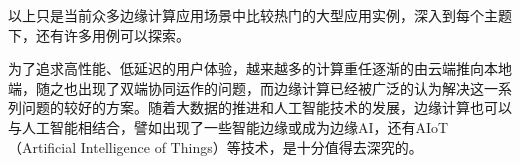 \documentclass[UTF8,12pt,twoside,a4paper]{ctexart} %
\begin{document}
以上只是当前众多边缘计算应用场景中比较热门的大型应用实例，深入到每个主题下，还有许多用例可以探索。 
\vspace{10pt}

\clearpage{\pagestyle{empty}}%


\begin{center}
\end{center}
\vspace*{10pt}
\songti
\hspace{1.6em}
为了追求高性能、低延迟的用户体验，越来越多的计算重任逐渐的由云端推向本地端，随之也出现了双端协同运作的问题，而边缘计算已经被广泛的认为解决这一系列问题的较好的方案。随着大数据的推进和人工智能技术的发展，边缘计算也可以与人工智能相结合，譬如出现了一些智能边缘或成为边缘AI，还有AIoT（Artificial Intelligence of Things）等技术，是十分值得去深究的。

\clearpage{\pagestyle{empty}}%

\renewcommand{\refname}{\zihao{2}{参考文献}}


\clearpage{\pagestyle{empty}}%
\end{document}
